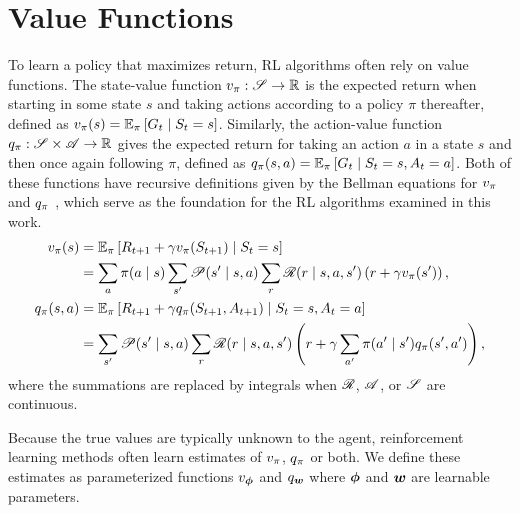   \section{Value Functions}
  To learn a policy that maximizes return, RL algorithms often rely on value functions. The state-value function $v_{\pi}: \mathscr{S} \to \mathbb{R}$ is the expected return when starting in some state $s$ and taking actions according to a policy $\pi$ thereafter, defined as $v_{\pi}(s) = \mathbb{E}_\pi \left[ G_t \mid S_t = s \right] $. Similarly, the action-value function $q_{\pi}: \mathscr{S} \times \mathscr{A} \to \mathbb{R}$ gives the expected return for taking an action $a$ in a state $s$ and then once again following $\pi$, defined as $ q_{\pi}(s, a) = \mathbb{E}_\pi \left[ G_t \mid S_t = s, A_t = a \right] $. 
  Both of these functions have recursive definitions given by the Bellman equations for $v_{\pi}$ and $q_{\pi}$ , which serve as the foundation for the RL algorithms examined in this work. 
  \begin{align}
      v_{\pi}(s) &= \operatorname{\mathbb{E}}_\pi \left[ R_{t+1} + \gamma v_{\pi}(S_{t+1}) \mid S_t = s \right] \nonumber \\
      &= \sum_{a} \pi(a \mid s) \sum_{s'} \mathscr{P}(s' \mid s, a) \sum_{r} \mathscr{R}(r \mid s, a, s') \left( r + \gamma v_{\pi}(s') \right),
      \label{eq:bellman_v} \\
      q_{\pi}(s, a) &= \operatorname{\mathbb{E}}_\pi \left[ R_{t+1} + \gamma q_{\pi}(S_{t+1}, A_{t+1}) \mid S_t = s, A_t = a \right] \nonumber \\
      &= \sum_{s'} \mathscr{P}(s' \mid s, a) \sum_{r} \mathscr{R}(r \mid s, a, s') \left( r + \gamma \sum_{a'} \pi(a' \mid s') q_{\pi}(s', a') \right),
      \label{eq:bellman_q}
  \end{align}
  where the summations are replaced by integrals when $\mathscr{R}$, $\mathscr{A}$, or $\mathscr{S}$ are continuous. 
  
  Because the true values are typically unknown to the agent, reinforcement learning methods often learn estimates of $v_{\pi}$, $q_{\pi}$ or both. We define these estimates as parameterized functions $v_{\bm \phi}$ and $q_{\bm w}$ where ${\bm \phi}$ and ${\bm w}$ are learnable parameters. 
  
